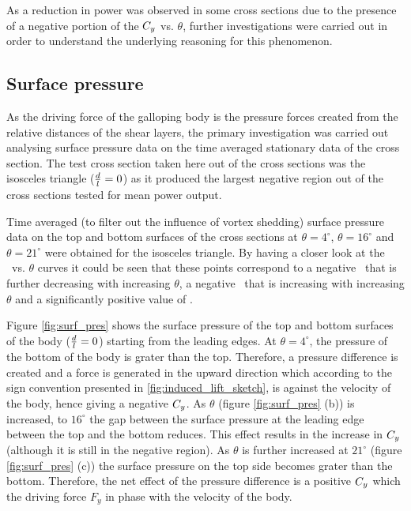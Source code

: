 As a reduction in power was observed in some cross sections due to the presence of a negative portion of the $C_{y}$ vs. $\theta$, further investigations were carried out in order to understand the underlying reasoning for this phenomenon.

\subsection{Surface pressure}
\label{subsec:cross-sec-surface pressure}

As the driving force of the galloping body is the pressure forces created from the relative distances of the shear layers, the primary investigation was carried out analysing surface pressure data on the time averaged stationary data of the cross section. The test cross section taken here out of the cross sections was the isosceles triangle ($\frac{d}{l}=0$) as it produced the largest negative region out of the cross sections tested for mean power output. 

Time averaged (to filter out the influence of vortex shedding) surface pressure data  on the top and bottom surfaces of the cross sections at $\theta=4^{\circ}$, $\theta=16^{\circ}$ and $\theta=21^{\circ}$ were obtained for the isosceles triangle. By having a closer look at the \cy\ vs. $\theta$ curves it could be seen that these points correspond to a negative \cy\ that is further decreasing with increasing $\theta$, a negative \cy\ that is increasing with increasing $\theta$ and a significantly positive value of \cy.        
 
 
 
 
 
Figure \ref{fig:surf_pres} shows the surface pressure of the top and bottom surfaces of the body ($\frac{d}{l}=0$) starting from  the leading edges. At $\theta=4^{\circ}$, the pressure of the bottom of the body is grater than the top. Therefore, a pressure difference is created and a force is generated in the upward direction which according to the sign convention presented in \ref{fig:induced_lift_sketch}, is against the velocity of the body, hence giving a negative $C_{y}$. As $\theta$ (figure \ref{fig:surf_pres} (b)) is increased, to $16^{\circ}$ the gap between the surface pressure at the leading edge between the top and the bottom reduces. This effect results in the increase in $C_{y}$ (although it is still in the negative region). As $\theta$ is further increased at $21^{\circ}$ (figure \ref{fig:surf_pres} (c)) the surface pressure on the top side becomes grater than the bottom. Therefore, the net effect of the pressure difference is a positive $C_{y}$ which the driving force $F_y$ in phase with the velocity of the body.

